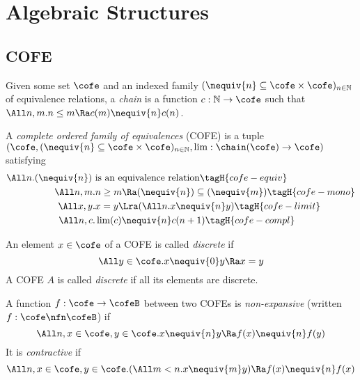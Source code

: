 \section{Algebraic Structures}

\subsection{COFE}

\begin{defn}[Chain]
  Given some set $\cofe$ and an indexed family $({\nequiv{n}} \subseteq \cofe \times \cofe)_{n \in \mathbb{N}}$ of equivalence relations, a \emph{chain} is a function $c : \mathbb{N} \to \cofe$ such that $\All n, m. n \leq m \Ra c (m) \nequiv{n} c (n)$.
\end{defn}

\begin{defn}
  A \emph{complete ordered family of equivalences} (COFE) is a tuple $(\cofe, ({\nequiv{n}} \subseteq \cofe \times \cofe)_{n \in \mathbb{N}}, \lim : \chain(\cofe) \to \cofe)$ satisfying
  \begin{align*}
    \All n. (\nequiv{n}) ~& \text{is an equivalence relation} \tagH{cofe-equiv} \\
    \All n, m.& n \geq m \Ra (\nequiv{n}) \subseteq (\nequiv{m}) \tagH{cofe-mono} \\
    \All x, y.& x = y \Lra (\All n. x \nequiv{n} y) \tagH{cofe-limit} \\
    \All n, c.& \lim(c) \nequiv{n} c(n+1) \tagH{cofe-compl}
  \end{align*}
\end{defn}


\begin{defn}
  An element $x \in \cofe$ of a COFE is called \emph{discrete} if
  \[ \All y \in \cofe. x \nequiv{0} y \Ra x = y\]
  A COFE $A$ is called \emph{discrete} if all its elements are discrete.
\end{defn}

\begin{defn}
  A function $f : \cofe \to \cofeB$ between two COFEs is \emph{non-expansive} (written $f : \cofe \nfn \cofeB$) if
  \[\All n, x \in \cofe, y \in \cofe. x \nequiv{n} y \Ra f(x) \nequiv{n} f(y) \]
  It is \emph{contractive} if
  \[ \All n, x \in \cofe, y \in \cofe. (\All m < n. x \nequiv{m} y) \Ra f(x) \nequiv{n} f(x) \]
\end{defn}

